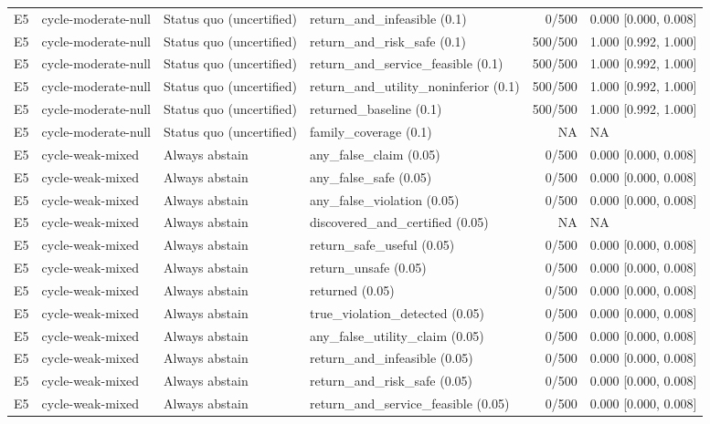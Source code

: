 \begin{longtable}{p{.04\linewidth}p{.18\linewidth}p{.19\linewidth}p{.16\linewidth}r p{.21\linewidth}}
E5 & cycle-moderate-null & Status quo (uncertified) & return\_and\_infeasible (0.1) & 0/500 & 0.000 [0.000, 0.008]\\
E5 & cycle-moderate-null & Status quo (uncertified) & return\_and\_risk\_safe (0.1) & 500/500 & 1.000 [0.992, 1.000]\\
E5 & cycle-moderate-null & Status quo (uncertified) & return\_and\_service\_feasible (0.1) & 500/500 & 1.000 [0.992, 1.000]\\
E5 & cycle-moderate-null & Status quo (uncertified) & return\_and\_utility\_noninferior (0.1) & 500/500 & 1.000 [0.992, 1.000]\\
E5 & cycle-moderate-null & Status quo (uncertified) & returned\_baseline (0.1) & 500/500 & 1.000 [0.992, 1.000]\\
E5 & cycle-moderate-null & Status quo (uncertified) & family\_coverage (0.1) & NA & NA\\
E5 & cycle-weak-mixed & Always abstain & any\_false\_claim (0.05) & 0/500 & 0.000 [0.000, 0.008]\\
E5 & cycle-weak-mixed & Always abstain & any\_false\_safe (0.05) & 0/500 & 0.000 [0.000, 0.008]\\
E5 & cycle-weak-mixed & Always abstain & any\_false\_violation (0.05) & 0/500 & 0.000 [0.000, 0.008]\\
E5 & cycle-weak-mixed & Always abstain & discovered\_and\_certified (0.05) & NA & NA\\
E5 & cycle-weak-mixed & Always abstain & return\_safe\_useful (0.05) & 0/500 & 0.000 [0.000, 0.008]\\
E5 & cycle-weak-mixed & Always abstain & return\_unsafe (0.05) & 0/500 & 0.000 [0.000, 0.008]\\
E5 & cycle-weak-mixed & Always abstain & returned (0.05) & 0/500 & 0.000 [0.000, 0.008]\\
E5 & cycle-weak-mixed & Always abstain & true\_violation\_detected (0.05) & 0/500 & 0.000 [0.000, 0.008]\\
E5 & cycle-weak-mixed & Always abstain & any\_false\_utility\_claim (0.05) & 0/500 & 0.000 [0.000, 0.008]\\
E5 & cycle-weak-mixed & Always abstain & return\_and\_infeasible (0.05) & 0/500 & 0.000 [0.000, 0.008]\\
E5 & cycle-weak-mixed & Always abstain & return\_and\_risk\_safe (0.05) & 0/500 & 0.000 [0.000, 0.008]\\
E5 & cycle-weak-mixed & Always abstain & return\_and\_service\_feasible (0.05) & 0/500 & 0.000 [0.000, 0.008]\\

\end{longtable}
